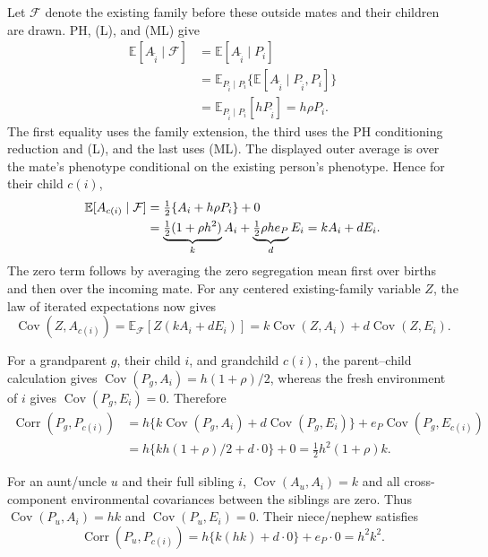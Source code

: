 Let $\mathcal F$ denote the existing family before these outside mates
and their children are drawn. PH, (L), and (ML) give
\begin{align*}
 \mathbb E[A_{\widetilde i}\mid\mathcal F]
 &=\mathbb E[A_{\widetilde i}\mid P_i]\\
 &=\mathbb E_{P_{\widetilde i}\mid P_i}
       \{\mathbb E[A_{\widetilde i}\mid P_{\widetilde i},P_i]\}\\
 &=\mathbb E_{P_{\widetilde i}\mid P_i}[hP_{\widetilde i}]
   =h\rho P_i.
\end{align*}
The first equality uses the family extension, the third uses the
PH conditioning reduction and (L), and the last uses (ML).
The displayed outer average is over the mate's phenotype conditional
on the existing person's phenotype. Hence for their child $c(i)$,
\begin{align}
 \mathbb E[A_{c(i)}\mid\mathcal F]
 &=\tfrac12\{A_i+h\rho P_i\}+0\notag\\
 &=\underbrace{\tfrac12(1+\rho h^2)}_{k}A_i
   +\underbrace{\tfrac12\rho h e_P}_{d}E_i
   =kA_i+dE_i.
 \label{eq:model-child-mean}
\end{align}
The zero term follows by averaging the zero segregation mean first
over births and then over the incoming mate. For any centered
existing-family variable $Z$, the law of iterated expectations now gives
\[
 \operatorname{Cov}(Z,A_{c(i)})
 =\mathbb E_{\mathcal F}[Z(kA_i+dE_i)]
 =k\operatorname{Cov}(Z,A_i)+d\operatorname{Cov}(Z,E_i).
\]

For a grandparent $g$, their child $i$, and grandchild $c(i)$, the
parent--child calculation gives
$\operatorname{Cov}(P_g,A_i)=h(1+\rho)/2$, whereas the fresh environment
of $i$ gives $\operatorname{Cov}(P_g,E_i)=0$. Therefore
\begin{align*}
 \operatorname{Corr}(P_g,P_{c(i)})
 &=h\{k\operatorname{Cov}(P_g,A_i)
       +d\operatorname{Cov}(P_g,E_i)\}
       +e_P\operatorname{Cov}(P_g,E_{c(i)})\\
 &=h\{kh(1+\rho)/2+d\cdot0\}+0
   =\boxed{\tfrac12h^2(1+\rho)k}.
\end{align*}

For an aunt/uncle $u$ and their full sibling $i$,
$\operatorname{Cov}(A_u,A_i)=k$ and all cross-component environmental
covariances between the siblings are zero. Thus
$\operatorname{Cov}(P_u,A_i)=hk$ and
$\operatorname{Cov}(P_u,E_i)=0$. Their niece/nephew satisfies
\[
 \operatorname{Corr}(P_u,P_{c(i)})
 =h\{k(hk)+d\cdot0\}+e_P\cdot0=\boxed{h^2k^2}.
\]

